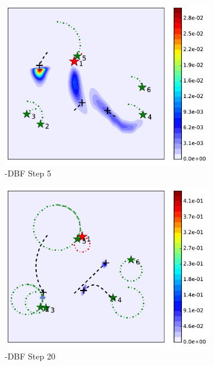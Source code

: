 	\begin{figure}%
		\centering		
		\begin{subfigure}[b]{0.23\textwidth}
			\includegraphics[width=\textwidth]{figures/hetero_mov_sen_mov_tar_rbt1_step5}
			\caption{\proto-DBF Step 5}\label{fig:step5}
		\end{subfigure}
		\begin{subfigure}[b]{0.23\textwidth}
			\includegraphics[width=\textwidth]{figures/hetero_mov_sen_mov_tar_rbt1_step20}
			\caption{\proto-DBF Step 20}\label{fig:step20}
		\end{subfigure}
		\begin{subfigure}[b]{0.23\textwidth}

\end{subfigure}
\end{figure}
